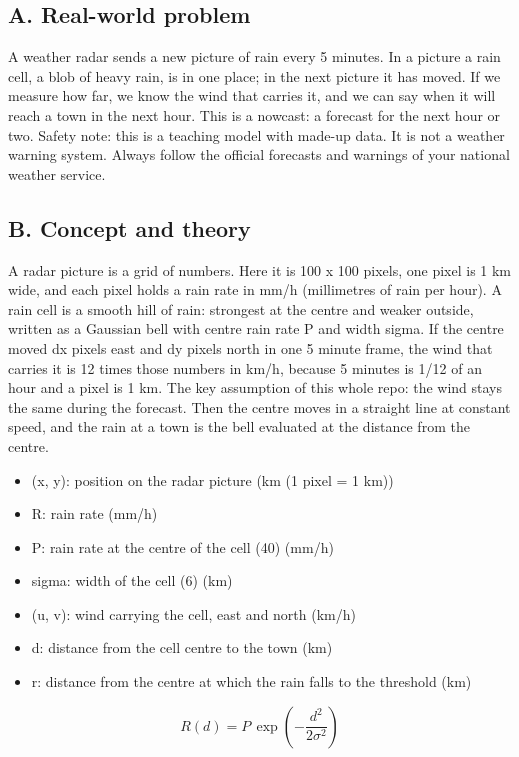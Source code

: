 \documentclass[11pt,a4paper]{article}
\begin{document}
\subsection*{A. Real-world problem}
A weather radar sends a new picture of rain every 5 minutes. In a picture a rain cell, a blob of heavy rain, is in one place; in the next picture it has moved. If we measure how far, we know the wind that carries it, and we can say when it will reach a town in the next hour. This is a nowcast: a forecast for the next hour or two. Safety note: this is a teaching model with made-up data. It is not a weather warning system. Always follow the official forecasts and warnings of your national weather service.

\subsection*{B. Concept and theory}
A radar picture is a grid of numbers. Here it is 100 x 100 pixels, one pixel is 1 km wide, and each pixel holds a rain rate in mm/h (millimetres of rain per hour). A rain cell is a smooth hill of rain: strongest at the centre and weaker outside, written as a Gaussian bell with centre rain rate P and width sigma. If the centre moved dx pixels east and dy pixels north in one 5 minute frame, the wind that carries it is 12 times those numbers in km/h, because 5 minutes is 1/12 of an hour and a pixel is 1 km. The key assumption of this whole repo: the wind stays the same during the forecast. Then the centre moves in a straight line at constant speed, and the rain at a town is the bell evaluated at the distance from the centre.

\begin{itemize}[nosep]
\item (x, y): position on the radar picture (km (1 pixel = 1 km))
\item R: rain rate (mm/h)
\item P: rain rate at the centre of the cell (40) (mm/h)
\item sigma: width of the cell (6) (km)
\item (u, v): wind carrying the cell, east and north (km/h)
\item d: distance from the cell centre to the town (km)
\item r: distance from the centre at which the rain falls to the threshold (km)
\end{itemize}

\begin{equation*}
R(d)=P\,\exp\!\left(-\frac{d^{2}}{2\sigma^{2}}\right)
\end{equation*}
\end{document}
